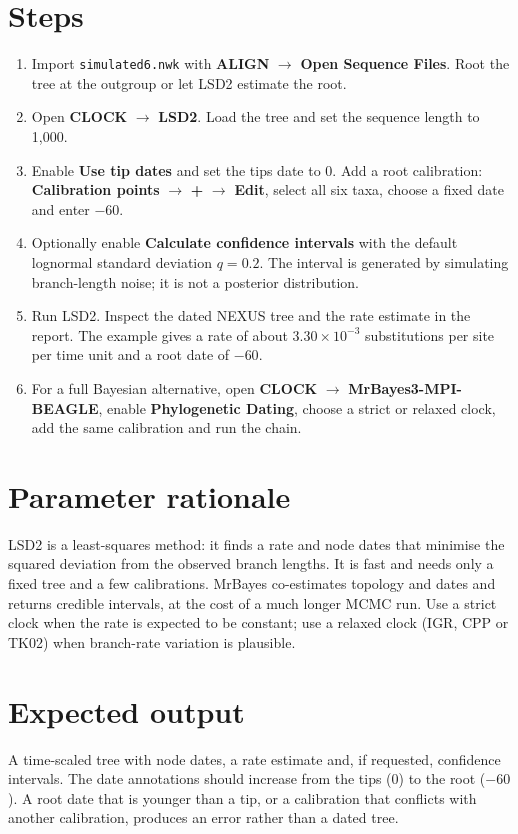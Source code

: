 \documentclass[11pt]{report}
\begin{document}
\section{Steps}
\begin{enumerate}
  \item Import \texttt{simulated6.nwk} with \textbf{ALIGN} $\rightarrow$
  \textbf{Open Sequence Files}. Root the tree at the outgroup or let LSD2
  estimate the root.
  \item Open \textbf{CLOCK} $\rightarrow$ \textbf{LSD2}. Load the tree and set
  the sequence length to 1,000.
  \item Enable \textbf{Use tip dates} and set the tips date to 0. Add a root
  calibration: \textbf{Calibration points} $\rightarrow$ \textbf{+} $\rightarrow$
  \textbf{Edit}, select all six taxa, choose a fixed date and enter $-60$.
  \item Optionally enable \textbf{Calculate confidence intervals} with the
  default lognormal standard deviation $q=0.2$. The interval is generated by
  simulating branch-length noise; it is not a posterior distribution.
  \item Run LSD2. Inspect the dated NEXUS tree and the rate estimate in the
  report. The example gives a rate of about $3.30\times10^{-3}$ substitutions
  per site per time unit and a root date of $-60$.
  \item For a full Bayesian alternative, open \textbf{CLOCK} $\rightarrow$
  \textbf{MrBayes3-MPI-BEAGLE}, enable \textbf{Phylogenetic Dating}, choose a
  strict or relaxed clock, add the same calibration and run the chain.
\end{enumerate}

\section{Parameter rationale}
LSD2 is a least-squares method: it finds a rate and node dates that minimise
the squared deviation from the observed branch lengths. It is fast and needs
only a fixed tree and a few calibrations. MrBayes co-estimates topology and
dates and returns credible intervals, at the cost of a much longer MCMC run.
Use a strict clock when the rate is expected to be constant; use a relaxed
clock (IGR, CPP or TK02) when branch-rate variation is plausible.

\section{Expected output}
A time-scaled tree with node dates, a rate estimate and, if requested,
confidence intervals. The date annotations should increase from the tips
(0) to the root ($-60$). A root date that is younger than a tip, or a
calibration that conflicts with another calibration, produces an error rather
than a dated tree.
\end{document}
